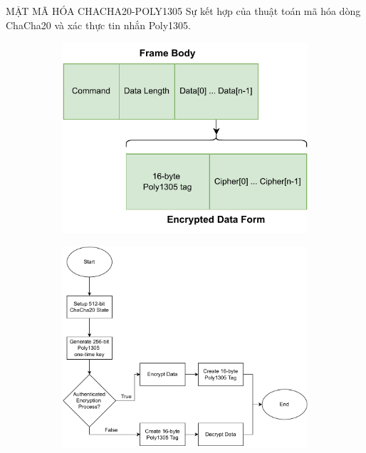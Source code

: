 \begin{frame}{MẬT MÃ HÓA CHACHA20-POLY1305}
	Sự kết hợp của thuật toán mã hóa dòng ChaCha20 và xác thực tin nhắn Poly1305.

	\begin{figure}
		\subfigure
		{
		\begin{minipage}{0.3\linewidth}
    		\begin{figure}
    			\raggedright
    			\includegraphics[scale=0.5]{pic/Presentation-Page-10-Frame-Body-Encrypt-Structure.pdf}
    		\end{figure}
    	\end{minipage}
		}
		\subfigure
		{
		\begin{minipage}{0.6\linewidth}
    		\begin{figure}
    			\hspace*{.5cm}
				\raggedright
    			\includegraphics[width=1.0\textwidth,height=.7\textheight]{pic/Presentation-Page-9-CC20-P1305-Process.pdf}
    		\end{figure}
    	\end{minipage}
		}
	\end{figure}
\end{frame}
